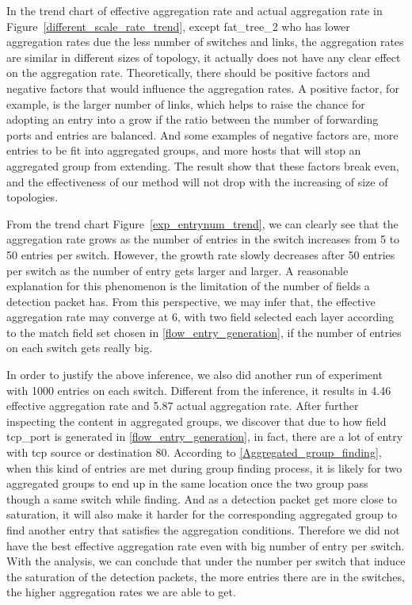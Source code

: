 In the trend chart of effective aggregation rate and actual aggregation rate in Figure~\ref{different_scale_rate_trend}, except fat\_tree\_2 who has lower aggregation rates due the less number of switches and links, 
the aggregation rates are similar in different sizes of topology, it actually does not have any clear effect on the aggregation rate. Theoretically, there should be positive factors and negative factors that would influence the aggregation rates. A positive factor, for example, is the larger number of links, which helps to raise the chance for adopting an entry into a grow if the ratio between the number of forwarding ports and entries are balanced. And some examples of negative factors are, more entries to be fit into aggregated groups, and more hosts that will stop an aggregated group from extending. The result show that these factors break even, and the effectiveness of our method will not drop with the increasing of size of topologies.

From the trend chart Figure~\ref{exp_entrynum_trend}, we can clearly see that the aggregation rate grows as the number of entries in the switch increases from 5 to 50 entries per switch. However, the growth rate slowly decreases after 50 entries per switch as the number of entry gets larger and larger. A reasonable explanation for this phenomenon is the limitation of the number of fields a detection packet has. From this perspective, we may infer that, the effective aggregation rate may converge at 6, with two field selected each layer according to the match field set chosen in \ref{flow_entry_generation}, if the number of entries on each switch gets really big.

In order to justify the above inference, we also did another run of experiment with 1000 entries on each switch. Different from the inference, it results in 4.46 effective aggregation rate and 5.87 actual aggregation rate. After further inspecting the content in aggregated groups, we discover that due to how field tcp\_port is generated in \ref{flow_entry_generation}, in fact, there are a lot of entry with tcp source or destination 80. According to \ref{Aggregated_group_finding}, when this kind of entries are met during group finding process, it is likely for two aggregated groups to end up in the same location once the two group pass though a same switch while finding. And as a detection packet get more close to saturation, it will also make it harder for the corresponding aggregated group to find another entry that satisfies the aggregation conditions. Therefore we did not have the best effective aggregation rate even with big number of entry per switch. With the analysis, we can conclude that under the number per switch that induce the saturation of the detection packets, the more entries there are in the switches, the higher aggregation rates we are able to get.
